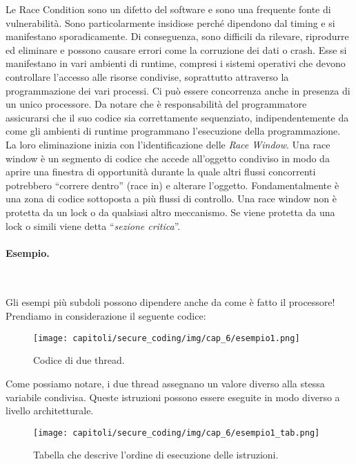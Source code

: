 Le Race Condition sono un difetto del software e sono una frequente fonte di
vulnerabilità.
Sono particolarmente insidiose perché dipendono dal timing e si manifestano
sporadicamente. Di conseguenza, sono difficili da rilevare, riprodurre ed
eliminare e possono
causare errori come la corruzione dei dati o crash.
Esse si manifestano in vari ambienti di runtime, compresi i sistemi operativi
che devono
controllare l'accesso alle risorse condivise, soprattutto attraverso la
programmazione dei vari
processi. Ci può essere concorrenza anche in presenza di un unico processore.
Da notare che è responsabilità del programmatore assicurarsi che il suo codice
sia correttamente
sequenziato, indipendentemente da come gli ambienti di runtime programmano
l'esecuzione
della programmazione.
La loro eliminazione inizia con l'identificazione delle \textit{Race Window}.
Una race window è un
segmento di codice che accede all'oggetto condiviso in modo da aprire una
finestra di opportunità
durante la quale altri flussi concorrenti potrebbero ``correre dentro'' (race in)
e alterare
l'oggetto. Fondamentalmente è una zona di codice sottoposta a più flussi di
controllo.
Una race window non è protetta da un lock o da qualsiasi altro meccanismo.
Se viene
protetta da una lock o simili viene detta ``\textit{sezione critica}''.

\vspace{-0.5em}

\paragraph{Esempio.}\

Gli esempi più subdoli possono dipendere anche da come è fatto il processore!
Prendiamo in considerazione il seguente codice:

\vspace{-0.5em}

\begin{figure}[H]
    \centering
    \texttt{[image: capitoli/secure\_coding/img/cap\_6/esempio1.png]}
    \caption{Codice di due thread.}
\end{figure}

\vspace{-1em}

Come possiamo notare, i due thread assegnano un valore diverso alla stessa variabile
condivisa. Queste istruzioni
possono essere eseguite in modo diverso a livello architetturale.

\begin{figure}[H]
    \centering
    \texttt{[image: capitoli/secure\_coding/img/cap\_6/esempio1\_tab.png]}
    \caption{Tabella che descrive l'ordine di esecuzione delle istruzioni.}
\end{figure}


